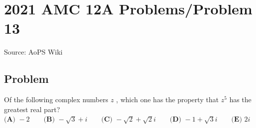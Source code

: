 \documentclass[12pt]{article}
\begin{document}
\section*{{2021 AMC 12A Problems/Problem 13}}
Source: AoPS Wiki

\subsection*{Problem}
Of the following complex numbers $z$ , which one has the property that $z^5$ has the greatest real part? $\textbf{(A) }{-}2 \qquad \textbf{(B) }{-}\sqrt3+i \qquad \textbf{(C) }{-}\sqrt2+\sqrt2 i \qquad \textbf{(D) }{-}1+\sqrt3 i\qquad \textbf{(E) }2i$
\end{document}
